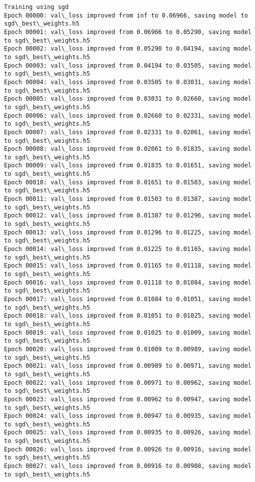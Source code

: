 \documentclass[11pt]{article}
\begin{document}
\begin{Verbatim}[commandchars=\\\{\}]
Training using sgd
Epoch 00000: val\_loss improved from inf to 0.06966, saving model to sgd\_best\_weights.h5
Epoch 00001: val\_loss improved from 0.06966 to 0.05290, saving model to sgd\_best\_weights.h5
Epoch 00002: val\_loss improved from 0.05290 to 0.04194, saving model to sgd\_best\_weights.h5
Epoch 00003: val\_loss improved from 0.04194 to 0.03505, saving model to sgd\_best\_weights.h5
Epoch 00004: val\_loss improved from 0.03505 to 0.03031, saving model to sgd\_best\_weights.h5
Epoch 00005: val\_loss improved from 0.03031 to 0.02660, saving model to sgd\_best\_weights.h5
Epoch 00006: val\_loss improved from 0.02660 to 0.02331, saving model to sgd\_best\_weights.h5
Epoch 00007: val\_loss improved from 0.02331 to 0.02061, saving model to sgd\_best\_weights.h5
Epoch 00008: val\_loss improved from 0.02061 to 0.01835, saving model to sgd\_best\_weights.h5
Epoch 00009: val\_loss improved from 0.01835 to 0.01651, saving model to sgd\_best\_weights.h5
Epoch 00010: val\_loss improved from 0.01651 to 0.01503, saving model to sgd\_best\_weights.h5
Epoch 00011: val\_loss improved from 0.01503 to 0.01387, saving model to sgd\_best\_weights.h5
Epoch 00012: val\_loss improved from 0.01387 to 0.01296, saving model to sgd\_best\_weights.h5
Epoch 00013: val\_loss improved from 0.01296 to 0.01225, saving model to sgd\_best\_weights.h5
Epoch 00014: val\_loss improved from 0.01225 to 0.01165, saving model to sgd\_best\_weights.h5
Epoch 00015: val\_loss improved from 0.01165 to 0.01118, saving model to sgd\_best\_weights.h5
Epoch 00016: val\_loss improved from 0.01118 to 0.01084, saving model to sgd\_best\_weights.h5
Epoch 00017: val\_loss improved from 0.01084 to 0.01051, saving model to sgd\_best\_weights.h5
Epoch 00018: val\_loss improved from 0.01051 to 0.01025, saving model to sgd\_best\_weights.h5
Epoch 00019: val\_loss improved from 0.01025 to 0.01009, saving model to sgd\_best\_weights.h5
Epoch 00020: val\_loss improved from 0.01009 to 0.00989, saving model to sgd\_best\_weights.h5
Epoch 00021: val\_loss improved from 0.00989 to 0.00971, saving model to sgd\_best\_weights.h5
Epoch 00022: val\_loss improved from 0.00971 to 0.00962, saving model to sgd\_best\_weights.h5
Epoch 00023: val\_loss improved from 0.00962 to 0.00947, saving model to sgd\_best\_weights.h5
Epoch 00024: val\_loss improved from 0.00947 to 0.00935, saving model to sgd\_best\_weights.h5
Epoch 00025: val\_loss improved from 0.00935 to 0.00926, saving model to sgd\_best\_weights.h5
Epoch 00026: val\_loss improved from 0.00926 to 0.00916, saving model to sgd\_best\_weights.h5
Epoch 00027: val\_loss improved from 0.00916 to 0.00908, saving model to sgd\_best\_weights.h5

\end{Verbatim}
\end{document}
